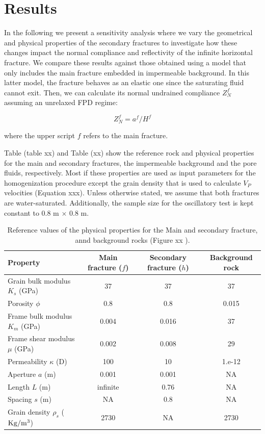 \documentclass[draft]{agujournal2019}
\begin{document}
\section{Results}

In the following we present a sensitivity analysis where we vary the geometrical and physical properties of the secondary fractures to investigate how these changes impact the normal compliance and reflectivity of the infinite horizontal fracture. We compare these results against those obtained using a model that only includes the main fracture embedded in impermeable background. In this latter model,  the fracture behaves as an elastic one since the saturating fluid cannot exit. Then, we can calculate its normal undrained compliance $Z^f_{N}$ assuming an unrelaxed FPD regime:
\begin{linenomath*}
\begin{equation}\label{Eq.x}
Z^f_{N}= a^f/H^f 
\end{equation}
\end{linenomath*}
where the upper script $f$ refers to the main fracture.


Table (table xx) and Table (xx) show the reference rock and physical properties for the main and secondary fractures,  the impermeable background and the pore fluids, respectively. Most if these properties are used as input parameters for the homogenization procedure except the grain density that is used to calculate $V_P$ velocities (Equation xxx). Unless otherwise stated, we assume that both fractures are water-saturated.
Additionally, the sample size for the oscillatory test is kept constant to 0.8 m $\times$ 0.8 m.

\begin{table}[!ht]
  \caption{Reference values of the physical properties for the Main and secondary fracture, annd background rocks (Figure xx ). }
\begin{center}
  \begin{tabular}{ | l c  c  c | }
    \hline
    Property & Main fracture ($f$) & Secondary fracture ($h$) & Background rock \\ \hline
    Grain bulk modulus $K_s$ (GPa) & 37 & 37 & 37 \\ 
    Porosity $\phi$ & 0.8 & 0.8 & 0.015 \\ 
    Frame bulk modulus $K_m$ (GPa) &  0.004 & 0.016 & 37\\ 
    Frame shear modulus $\mu$ (GPa) & 0.002 & 0.008 & 29\\
    Permeability $\kappa$ (D) & 100 & 10 & 1.e-12\\
    Aperture $a$ (m) & 0.001 & 0.001 & NA\\
    Length $L$ (m) & infinite & 0.76 & NA \\
    Spacing $s$ (m) & NA & 0.8 & NA \\
    Grain density $\rho_s$ ($\rm{Kg/m^3}$) & 2730 & NA & 2730\\ 
    \hline
  \end{tabular}
  \label{table.1}
\end{center}
\end{table}
\end{document}
